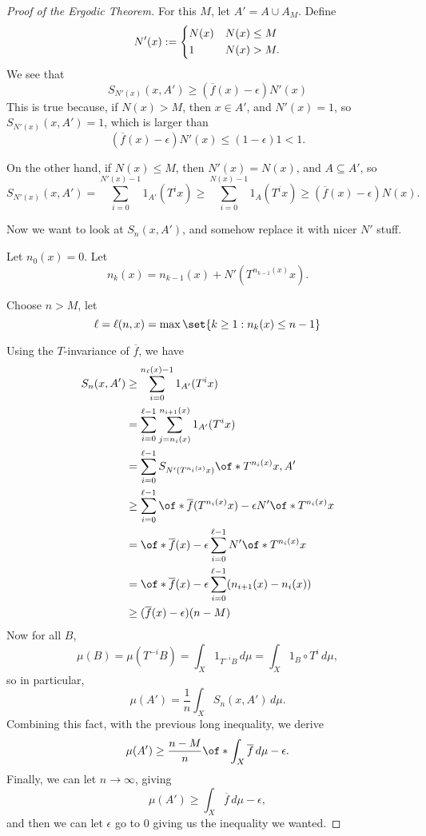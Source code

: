 \documentclass{article}
\newcommand\oln\overline
\theoremstyle{remark}
\begin{document}
\begin{proof}[Proof of the Ergodic Theorem]
    For this $M$, let $A'=A\cup A_M$. Define
    \[ N'(x) :=
        \begin{dcases}
            N(x) & N(x) \le M\\
            1 & N(x) > M.
        \end{dcases}
    \]
    We see that 
    \[
        S_{N'(x)}(x,A') 
        \ge (\oln{f}(x)-\epsilon)N'(x)
    \]
    This is true because, if $N(x) > M$, then $x\in A'$,
    and $N'(x)=1$, so 
    $S_{N'(x)}(x,A')= 1$, which is larger than 
    \[ (\oln{f}(x)-\epsilon)N'(x) \le (1-\epsilon)1 < 1. \]

    On the other hand, if $N(x)\le M$, then $N'(x)=N(x)$,
    and $A\subseteq A'$, so 
    \[ S_{N'(x)}(x,A')
    = \sum_{i=0}^{N'(x)-1}1_{A'}(T^ix)
    \ge \sum_{i=0}^{N(x)-1}1_{A}(T^ix)
    \ge (\oln{f}(x)-\epsilon) N(x).
    \]

    Now we want to look at $S_n(x,A')$, and somehow replace it 
    with nicer $N'$ stuff.

    Let $n_0(x)=0$.
    Let 
    \[ n_k(x) = n_{k-1}(x) + N'(T^{n_{k-1}(x)}x). \]
    
    Choose $n>M$, let 
    \[ \ell = \ell(n,x) = \max \set{k\ge 1 : n_k(x) \le n-1} \]

    Using the $T$-invariance of $\oln{f}$, we have 
    \begin{align*}
        S_n(x,A')
        &\ge \sum_{i=0}^{n_\ell(x)-1}
        1_{A'}(T^ix)
        \\
        &=
        \sum_{i=0}^{\ell-1}
        \sum_{j=n_i(x)}^{n_{i+1}(x)}
        1_{A'}(T^ix)
        \\
        &=
        \sum_{i=0}^{\ell-1}
        S_{
            N'(T^{n_i(x)}x)}
        \of*{
            T^{n_i(x)}x,A'
        }
        \\
        &\ge 
        \sum_{i=0}^{\ell-1}
        \of*{\oln{f}(T^{n_i(x)}x) -\epsilon}N'\of*{
            T^{n_i(x)} x
        }
        \\
        &=
        \of*{\oln{f}(x) -\epsilon}
        \sum_{i=0}^{\ell-1}
        N'\of*{
            T^{n_i(x)} x
        }
        \\
        &=
        \of*{\oln{f}(x) -\epsilon}
        \sum_{i=0}^{\ell-1}
        (n_{i+1}(x)-n_i(x))
        \\
        &\ge 
        (\oln{f}(x)-\epsilon)(n-M)
    \end{align*}
    Now for all $B$, 
    \[ \mu(B)=\mu(T^{-i}B) = \int_X 1_{T^{-i}B} \,d\mu 
    = \int_X 1_B\circ T^i \, d\mu,
    \]
    so in particular, 
    \[ \mu(A') = \frac{1}{n} \int_X S_n(x,A') \,d\mu. \]
    Combining this fact, with the previous long inequality,
    we derive
    \[ \mu(A') \ge \frac{n-M}{n} \of*{
        \int_X \oln{f}\,d\mu -\epsilon 
    }.\]
    Finally, we can let $n\to \infty$, giving 
    \[ \mu(A') \ge 
        \int_X \oln{f}\,d\mu -\epsilon 
    ,\]
    and then we can let $\epsilon$ go to $0$
    giving us the inequality we wanted.


\end{proof}
\end{document}
